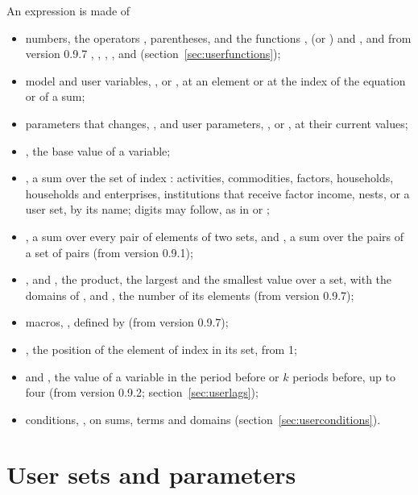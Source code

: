 An expression is made of
\begin{itemize}
\item numbers, the operators \cmd{+ - * / ^}, parentheses, and the functions
,  (or ) and , and from version
0.9.7 , , , ,  and
 (section~\ref{sec:userfunctions});
\item model and user variables, ,  or ,
at an element or at the index of the equation or of a sum;
\item parameters that  changes, , and user
parameters, ,  or , at their current
values;
\item {}, the base value of a variable;
\item {}, a sum over the set of index : 
activities,  commodities,  factors,  households, 
households and enterprises,  institutions that receive factor income,
 nests, or a user set, by its name; digits may follow, as in 
or ;
\item {}, a sum over every pair of elements of two
sets, and , a sum over the pairs of a set of
pairs (from version 0.9.1);
\item {},  and , the product, the largest
and the smallest value over a set, with the domains of , and
, the number of its elements (from version 0.9.7);
\item macros, , defined by  (from version
0.9.7);
\item {}, the position of the element of index  in its set,
from 1;
\item {} and , the value of a variable in the
period before or $k$ periods before, up to four (from version 0.9.2;
section~\ref{sec:userlags});
\item conditions, , on sums, terms and domains
(section~\ref{sec:userconditions}).
\end{itemize}

\section{User sets and parameters}

